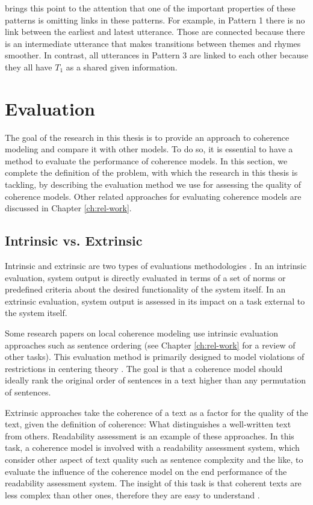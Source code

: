  brings this point to the attention that one of the important properties of these patterns is omitting links in these patterns.  
For example, in Pattern 1 there is no link between the earliest and latest utterance. 
Those are connected because there is an intermediate utterance that makes transitions between themes and rhymes smoother. 
In contrast, all utterances in Pattern 3  are linked to each other because they all have $T_1$ as a shared given information. 

\section{Evaluation}
\label{sec:coh-eval}

The goal of the research in this thesis is to provide an approach to coherence modeling and compare it with other models. 
To do so, it is essential to have a method to evaluate the performance of coherence models. 
In this section, we complete the definition of the problem, with which the research in this thesis is tackling, by describing the evaluation method we use for assessing the quality of coherence models. 
Other related approaches for evaluating coherence models are discussed in Chapter \ref{ch:rel-work}. 

\subsection{Intrinsic vs. Extrinsic}

Intrinsic and extrinsic are two types of evaluations methodologies \cite{}. 
In an intrinsic evaluation, system output is directly evaluated in terms of a set of norms or predefined criteria about the desired functionality of the system itself. 
In an extrinsic evaluation, system output is assessed in its impact on a task external to the system itself. 

Some research papers on local coherence modeling use intrinsic evaluation approaches such as sentence ordering \cite{karamanis04a,barzilay04} (see Chapter \ref{ch:rel-work} for a review of other tasks).  
This evaluation method is primarily designed to model violations of restrictions in centering theory . 
The goal is that a coherence model should ideally rank the original order of sentences in a text higher than any permutation of sentences. 

Extrinsic approaches take the coherence of a text as a factor for the quality of the text, given the definition of coherence: What distinguishes a well-written text from others. 
Readability assessment \cite{pitler08} is an example of these approaches. 
In this task, a coherence model is involved with a readability assessment system, which consider other aspect of text quality such as sentence complexity and the like, to evaluate the influence of the coherence model on the end performance of the readability assessment system. 
The insight of this task is that coherent texts are less complex than other ones, therefore they are easy to understand \cite{pitler08}. 


